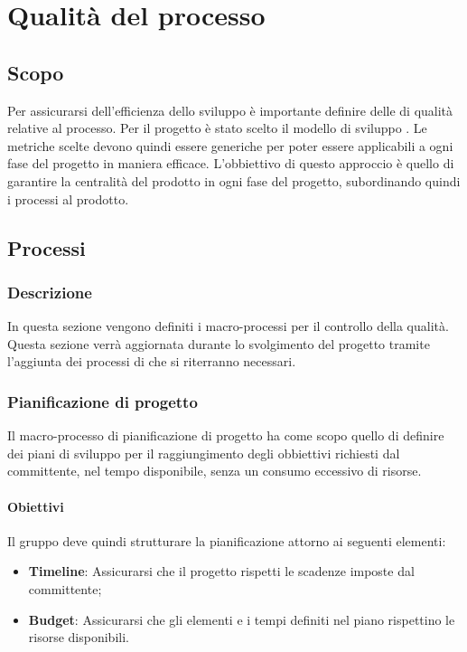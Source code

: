\section{Qualità del processo}

\subsection{Scopo}
Per assicurarsi dell'efficienza dello sviluppo è importante definire delle  di qualità relative al processo.
Per il progetto è stato scelto il modello di sviluppo .
Le metriche scelte devono quindi essere generiche per poter essere applicabili a ogni fase del progetto in maniera efficace.
L'obbiettivo di questo approccio è quello di garantire la centralità del prodotto in ogni fase del progetto, subordinando quindi i processi al prodotto.

\subsection{Processi}
\subsubsection{Descrizione}
In questa sezione vengono definiti i macro-processi per il controllo della qualità.
Questa sezione verrà aggiornata durante lo svolgimento del progetto tramite l'aggiunta dei processi di  che si riterranno necessari.

\subsubsection{Pianificazione di progetto}
Il macro-processo di pianificazione di progetto ha come scopo quello di definire dei piani di sviluppo per il raggiungimento degli obbiettivi richiesti dal committente, nel tempo disponibile, senza un consumo eccessivo di risorse.

\paragraph{Obiettivi}
Il gruppo \gruppo{} deve quindi strutturare la pianificazione attorno ai seguenti elementi:
\begin{itemize}
\item \textbf{Timeline}: Assicurarsi che il progetto rispetti le scadenze imposte dal committente;
\item \textbf{Budget}: Assicurarsi che gli elementi e i tempi definiti nel piano rispettino le risorse disponibili.
\end{itemize}

